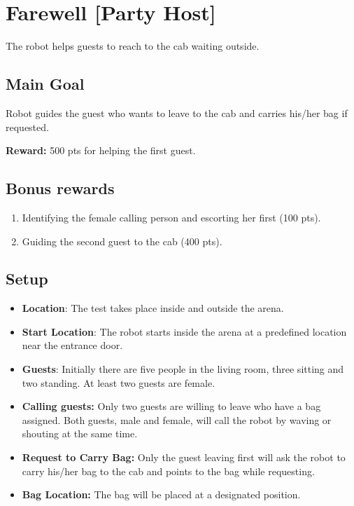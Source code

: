 \section{Farewell [Party Host]}
The robot helps guests to reach to the cab waiting outside.

\subsection{Main Goal}
Robot guides the guest who wants to leave to the cab and carries his/her bag if requested.

\noindent\textbf{Reward:} 500 pts for helping the first guest.

\subsection{Bonus rewards}
\begin{enumerate}[nosep]
	\item Identifying the female calling person and escorting her first (100 pts).
	\item Guiding the second guest to the cab (400 pts).
\end{enumerate}


\subsection{Setup}
\begin{itemize}
	\item \textbf{Location}: The test takes place inside and outside the arena.

	\item \textbf{Start Location}: The robot starts inside the arena at a predefined location near the entrance door.

	\item \textbf{Guests}: Initially there are five people in the living room, three sitting and two standing.
	At least two guests are female.

	\item \textbf{Calling guests:} Only two guests are willing to leave who have a bag assigned. Both guests, male and female, will call the robot by waving or shouting at the same time.
	
	\item \textbf{Request to Carry Bag:} Only the guest leaving first will ask the robot to carry his/her bag to the cab and points to the bag while requesting.
	
	\item \textbf{Bag Location:} The bag will be placed at a designated position.
\end{itemize}


